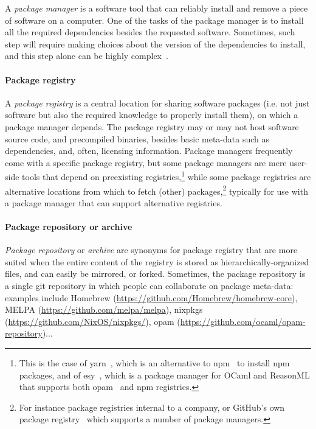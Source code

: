 A \emph{package manager} is a software tool that can reliably install and remove a piece of software on a computer.  One of the tasks of the package manager is to install all the required dependencies besides the requested software.  Sometimes, such step will require making choices about the version of the dependencies to install, and this step alone can be highly complex~\cite{mancinelli2006managing}.

\paragraph{Package registry}

A \emph{package registry} is a central location for sharing software packages (i.e. not just software but also the required knowledge to properly install them), on which a package manager depends.  The package registry may or may not host software source code, and precompiled binaries, besides basic meta-data such as dependencies, and, often, licensing information.
Package managers frequently come with a specific package registry, but some package managers are mere user-side tools that depend on preexisting registries,\footnote{
	This is the case of yarn~\cite{yarn}, which is an alternative to npm~\cite{npm} to install npm packages, and of esy~\cite{esy}, which is a package manager for OCaml and ReasonML that supports both opam~\cite{opam2013} and npm registries.
}
while some package registries are alternative locations from which to fetch (other) packages,\footnote{
	For instance package registries internal to a company, or GitHub's own package registry~\cite{github_registry} which supports a number of package managers.
} typically for use with a package manager that can support alternative registries.

\paragraph{Package repository or archive}

\emph{Package repository} or \emph{archive} are synonyms for package registry that are more suited when the entire content of the registry is stored as hierarchically-organized files, and can easily be mirrored, or forked.
Sometimes, the package repository is a single git repository in which people can collaborate on package meta-data:
examples include Homebrew (\url{https://github.com/Homebrew/homebrew-core}), MELPA (\url{https://github.com/melpa/melpa}), nixpkgs (\url{https://github.com/NixOS/nixpkgs/}), opam (\url{https://github.com/ocaml/opam-repository})...


